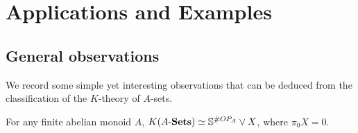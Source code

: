 \documentclass[11pt]{amsart}
\begin{document}



   


\section{Applications and Examples}\label{applications}

\subsection{General observations} We record some simple yet interesting observations that can be deduced from the classification of the $K$-theory of $A$-sets.

\begin{proposition} \label{prop:countingspheres}
    For any finite abelian monoid $A$, $K(A\text{-}\mathbf{Sets}) \simeq \mathbb{S}^{\# OP_A} \vee X$, where $\pi_0 X = 0$.
\end{proposition}
\end{document}
